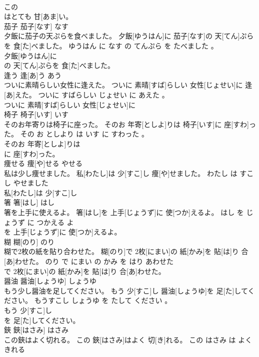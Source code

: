 \documentclass[8pt]{extreport}
\begin{document}
\begin{CJK}{UTF8}{min}
\\	この
\\	はとても 甘[あま]い。		
\\	茄子	茄子[なす]	なす	
\\	夕飯に茄子の天ぷらを食べました。	夕飯[ゆうはん]に 茄子[なす]の 天[てん]ぷらを 食[た]べました。	ゆうはん に なす の てんぷら を たべました 。	
\\	夕飯[ゆうはん]に
\\	の 天[てん]ぷらを 食[た]べました。		
\\	逢う	逢[あ]う	あう	
\\	ついに素晴らしい女性に逢えた。	ついに 素晴[すば]らしい 女性[じょせい]に 逢[あ]えた。	ついに すばらしい じょせい に あえた 。	
\\	ついに 素晴[すば]らしい 女性[じょせい]に
\\	椅子	椅子[いす]	いす	
\\	そのお年寄りは椅子に座った。	そのお 年寄[としよ]りは 椅子[いす]に 座[すわ]った。	その お としより は いす に すわった 。	
\\	そのお 年寄[としよ]りは
\\	に 座[すわ]った。		
\\	痩せる	痩[や]せる	やせる	
\\	私は少し痩せました。	私[わたし]は 少[すこ]し 痩[や]せました。	わたし は すこし やせました	
\\	私[わたし]は 少[すこ]し
\\	箸	箸[はし]	はし	
\\	箸を上手に使えるよ。	箸[はし]を 上手[じょうず]に 使[つか]えるよ。	はし を じょうず に つかえる よ	
\\	を 上手[じょうず]に 使[つか]えるよ。		
\\	糊	糊[のり]	のり	
\\	糊で2枚の紙を貼り合わせた。	糊[のり]で 2枚[にまい]の 紙[かみ]を 貼[は]り 合[あ]わせた。	のり で にまい の かみ を はり あわせた	
\\	で 2枚[にまい]の 紙[かみ]を 貼[は]り 合[あ]わせた。		
\\	醤油	醤油[しょうゆ]	しょうゆ	
\\	もう少し醤油を足してください。	もう 少[すこ]し 醤油[しょうゆ]を 足[た]してください。	もうすこし しょうゆ を たして ください 。	
\\	もう 少[すこ]し
\\	を 足[た]してください。		
\\	鋏	鋏[はさみ]	はさみ	
\\	この鋏はよく切れる。	この 鋏[はさみ]はよく 切[き]れる。	この はさみ は よく きれる	

\end{CJK}
\end{document}

